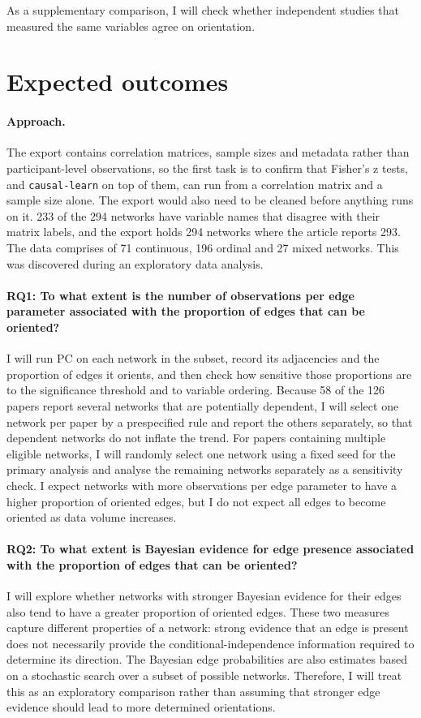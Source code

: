 \documentclass[a4paper]{article}
\begin{document}
As a supplementary comparison, I will check whether independent studies that measured
the same variables agree on orientation.

\section{Expected outcomes}

\paragraph{Approach.} The export contains correlation matrices, 
sample sizes and metadata rather than participant-level observations, so the first task is to confirm that Fisher's z tests, and \texttt{causal-learn} on top of them, can run from a
correlation matrix and a sample size alone. The export would also need to be cleaned before
anything runs on it. 233 of the 294 networks have variable names that disagree with
their matrix labels, and the export holds 294 networks where the article reports 293.
The data comprises of 71 continuous, 196 ordinal and 27 mixed networks. This was discovered during an exploratory data analysis.

\paragraph{RQ1: To what extent is the number of observations per edge parameter associated with the proportion of edges that can be oriented?} I will run PC on each network in the
subset, record its adjacencies and the proportion of edges it orients, and then check
how sensitive those proportions are to the significance threshold and to variable
ordering. Because 58 of the 126 papers report several networks that are potentially
dependent, I will select one network per paper by a prespecified rule and report the
others separately, so that dependent networks do not inflate the trend. For papers containing multiple eligible networks, I will randomly select one network using a fixed seed for the primary analysis and analyse the remaining networks separately as a sensitivity check. I expect networks with more observations per edge parameter to have a higher proportion of oriented edges, but I do not expect all edges to become oriented as data volume increases.

\paragraph{RQ2: To what extent is Bayesian evidence for edge presence associated with the proportion of edges that can be oriented?} I will explore whether networks with stronger Bayesian evidence for their edges also tend to have a greater proportion of oriented edges. These two measures capture different properties of a network: strong evidence that an edge is present does not necessarily provide the conditional-independence information required to determine its direction. The Bayesian edge probabilities are also estimates based on a stochastic search over a subset of possible networks. Therefore, I will treat this as an exploratory comparison rather than assuming that stronger edge evidence should lead to more determined orientations.
\end{document}
